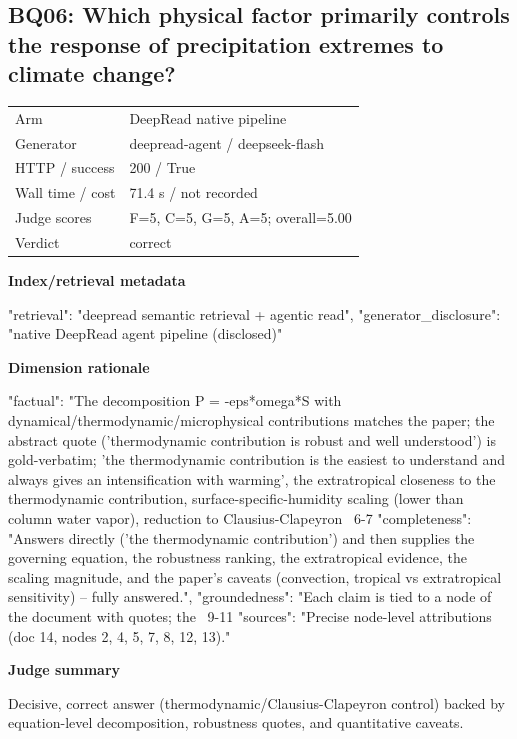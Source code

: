 \documentclass[10pt]{article}
\begin{document}
\subsection{BQ06: Which physical factor primarily controls the response of precipitation extremes to climate change?}
\begin{tabular}{@{}ll@{}}
Arm & DeepRead native pipeline\\
Generator & deepread-agent / deepseek-flash\\
HTTP / success & 200 / True\\
Wall time / cost & 71.4 s / not recorded\\
Judge scores & F=5, C=5, G=5, A=5; overall=5.00\\
Verdict & correct\\
\end{tabular}

\textbf{Index/retrieval metadata}
\begin{EvidenceText}
{
  "retrieval": "deepread semantic retrieval + agentic read",
  "generator_disclosure": "native DeepRead agent pipeline (disclosed)"
}
\end{EvidenceText}

\textbf{Dimension rationale}
\begin{EvidenceText}
{
  "factual": "The decomposition P = -eps*omega*S with dynamical/thermodynamic/microphysical contributions matches the paper; the abstract quote ('thermodynamic contribution is robust and well understood') is gold-verbatim; 'the thermodynamic contribution is the easiest to understand and always gives an intensification with warming', the extratropical closeness to the thermodynamic contribution, surface-specific-humidity scaling (lower than column water vapor), reduction to Clausius-Clapeyron ~6-7%
  "completeness": "Answers directly ('the thermodynamic contribution') and then supplies the governing equation, the robustness ranking, the extratropical evidence, the scaling magnitude, and the paper's caveats (convection, tropical vs extratropical sensitivity) -- fully answered.",
  "groundedness": "Each claim is tied to a node of the document with quotes; the ~9-11%
  "sources": "Precise node-level attributions (doc 14, nodes 2, 4, 5, 7, 8, 12, 13)."
}
\end{EvidenceText}

\textbf{Judge summary}
\begin{EvidenceText}
Decisive, correct answer (thermodynamic/Clausius-Clapeyron control) backed by equation-level decomposition, robustness quotes, and quantitative caveats.
\end{EvidenceText}
\end{document}

